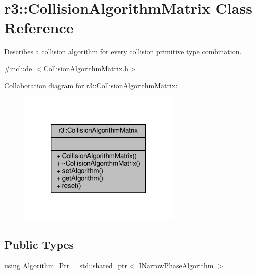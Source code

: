 \hypertarget{classr3_1_1_collision_algorithm_matrix}{}\section{r3\+:\+:Collision\+Algorithm\+Matrix Class Reference}
\label{classr3_1_1_collision_algorithm_matrix}


Describes a collision algorithm for every collision primitive type combination.  




{\ttfamily \#include $<$Collision\+Algorithm\+Matrix.\+h$>$}



Collaboration diagram for r3\+:\+:Collision\+Algorithm\+Matrix\+:\nopagebreak
\begin{figure}[H]
\begin{center}
\leavevmode
\includegraphics[width=223pt]{classr3_1_1_collision_algorithm_matrix__coll__graph}
\end{center}
\end{figure}
\subsection*{Public Types}
\begin{DoxyCompactItemize}
\item 
using \mbox{\hyperlink{classr3_1_1_collision_algorithm_matrix_ae68e99a7d5f10618fa4b82ee254052b9}{Algorithm\+\_\+\+Ptr}} = std\+::shared\+\_\+ptr$<$ \mbox{\hyperlink{classr3_1_1_i_narrow_phase_algorithm}{I\+Narrow\+Phase\+Algorithm}} $>$
\end{DoxyCompactItemize}
